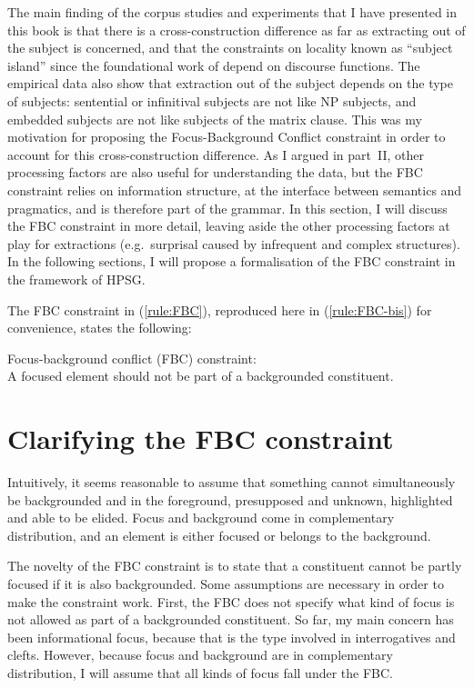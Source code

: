 The main finding of the corpus studies and experiments that I have presented in this book is that there is a cross-construction difference as far as extracting out of the subject is concerned, and that the constraints on locality known as ``subject island'' since the foundational work of \citet{Ross.1967} depend on discourse functions. The empirical data also show that extraction out of the subject depends on the type of subjects: sentential or infinitival subjects are not like NP subjects, and embedded subjects are not like subjects of the matrix clause. This was my motivation for proposing the Focus-Background Conflict constraint in order to account for this cross-construction difference. As I argued in part~II, other processing factors are also useful for understanding the data, but the FBC constraint relies on information structure, at the interface between semantics and pragmatics, and is therefore part of the grammar. 
In this section, I will discuss the FBC constraint in more detail, leaving aside the other processing factors at play for extractions (e.g.\ surprisal caused by infrequent and complex structures). In the following sections, I will propose a formalisation of the FBC constraint in the framework of HPSG.

The FBC constraint in (\ref{rule:FBC}), reproduced here in (\ref{rule:FBC-bis}) for convenience, states the following:

\ea Focus-background conflict (FBC) constraint:\\
A focused element should not be part of a backgrounded constituent.
\label{rule:FBC-bis}
\z 

\section{Clarifying the FBC constraint}

Intuitively, it seems reasonable to assume that something cannot simultaneously be backgrounded and in the foreground, presupposed and unknown, highlighted and able to be elided. Focus and background come in complementary distribution, and an element is either focused or belongs to the background. 

The novelty of the FBC constraint is to state that a constituent cannot be partly focused if it is also backgrounded. Some assumptions are necessary in order to make the constraint work. First, the FBC does not specify what kind of focus is not allowed as part of a backgrounded constituent. So far, my main concern has been informational focus, because that is the type involved in interrogatives and clefts. However, because focus and background are in complementary distribution, I will assume that all kinds of focus fall under the FBC. 


